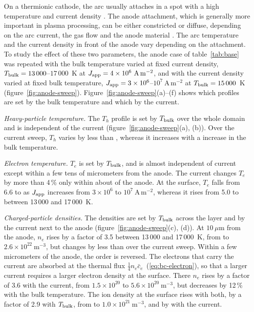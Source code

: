 On a thermionic cathode, the arc usually attaches in a spot with a high temperature and current density \cite{Hsu1983,LiangTrelles}. The anode attachment, which is generally more important in plasma processing, can be either constricted or diffuse, depending on the arc current, the gas flow and the anode material \cite{heberlein2010anode}. The arc temperature and the current density in front of the anode vary depending on the attachment. To study the effect of these two parameters, the anode case of table~\ref{tab:base} was repeated with the bulk temperature varied at fixed current density, \(T_{\rm bulk}=13\,000\)--\(17\,000\)~K at \(J_{\rm app}=4\times10^{6}\ \mathrm{A\,m^{-2}}\), and with the current density varied at fixed bulk temperature, \(J_{\rm app}=3\times10^{6}\)--\(10^{7}\ \mathrm{A\,m^{-2}}\) at \(T_{\rm bulk}=15\,000\)~K (figure~\ref{fig:anode-sweep}).  Figure~\ref{fig:anode-sweep}(a)--(f) shows which profiles are set by the bulk temperature and which by the current.

\emph{Heavy-particle temperature.} The \(T_h\) profile is set by \(T_{\rm bulk}\) over the whole domain and is  independent of the current (figure~\ref{fig:anode-sweep}(a), (b)). Over the current sweep, \(T_h\) varies by less than , whereas it increases with a increase in the bulk temperature.

\emph{Electron temperature.} \(T_e\) is set by \(T_{\rm bulk}\), and is almost independent of current except within a few tens of micrometers from the anode. The current changes \(T_e\) by more than 4\,\% only within about  of the anode. At the surface, \(T_e\) falls from 6.6 to  as \(J_{\rm app}\) increases from \(3\times10^{6}\) to \(10^{7}\ \mathrm{A\,m^{-2}}\), whereas it rises from 5.0 to  between 13\,000 and 17\,000~K.

\emph{Charged-particle densities.} The densities are set by \(T_{\rm bulk}\) across the layer and by the current next to the anode (figure~\ref{fig:anode-sweep}(c), (d)). At \(10\ \mu\)m from the anode, \(n_e\) rises by a factor of 3.5 between 13\,000 and 17\,000~K, from  to \(2.6\times10^{22}\ \mathrm{m^{-3}}\), but changes by less than  over the current sweep. Within a few micrometers of the anode, the order is reversed. The electrons that carry the current are absorbed at the thermal flux \(\tfrac14n_e\bar c_e\)~(\ref{eq:bc-electron}), so that a larger current requires a larger electron density at the surface. There \(n_e\) rises by a factor of 3.6 with the current, from \(1.5\times10^{20}\) to \(5.6\times10^{20}\ \mathrm{m^{-3}}\), but decreases by 12\,\% with the bulk temperature. The ion density at the surface rises with both, by a factor of 2.9 with \(T_{\rm bulk}\), from  to \(1.0\times10^{21}\ \mathrm{m^{-3}}\), and by  with the current.

